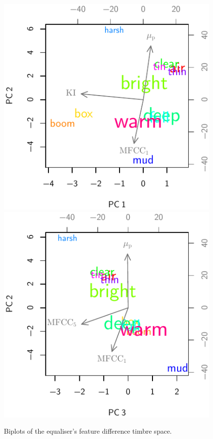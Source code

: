 			\begin{figure}[h!]
				\centering
				\subfloat
				{
					\includegraphics{chapter4/Images/EqualiserDifferenceCentroidsPCA1-2.pdf}
					\label{fig:EqualiserDifferenceCentroidsPCA1-2}
				}
				\quad
				\subfloat
				{
					\includegraphics{chapter4/Images/EqualiserDifferenceCentroidsPCA3-2.pdf}
					\label{fig:EqualiserDifferenceCentroidsPCA3-2}
				}
				\caption{Biplots of the equaliser's feature difference timbre space.}
				\label{fig:EqualiserDifferenceCentroidsPCAs}
			\end{figure}

